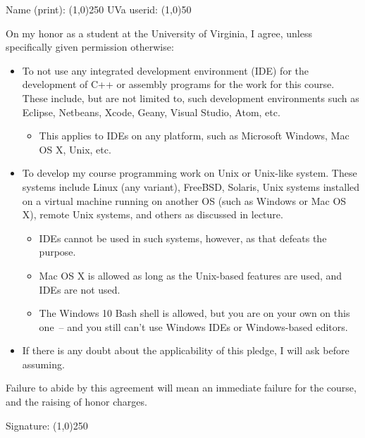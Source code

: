 \documentclass{article}
\begin{document}
\Large

\noindent Name (print): \line(1,0){250} \hspace{0.25in} UVa userid:
\line(1,0){50}

\vspace{0.5in}


\vspace{0.5in}

\noindent On my honor as a student at the University of Virginia, I
agree, unless specifically given permission otherwise:

\begin{itemize}

\item To not use any integrated development environment (IDE) for the
  development of C++ or assembly programs for the work for this
  course. These include, but are not limited to, such development
  environments such as Eclipse, Netbeans, Xcode, Geany, Visual Studio,
  Atom, etc.

\begin{itemize}

\item This applies to IDEs on any platform, such as Microsoft Windows,
  Mac OS X, Unix, etc.

\end{itemize}

\item To develop my course programming work on Unix or Unix-like
  system. These systems include Linux (any variant), FreeBSD, Solaris,
  Unix systems installed on a virtual machine running on another OS
  (such as Windows or Mac OS X), remote Unix systems, and others as
  discussed in lecture.

\begin{itemize}

\item IDEs cannot be used in such systems, however, as that defeats
  the purpose.

\item Mac OS X is allowed as long as the Unix-based features are used,
  and IDEs are not used.

\item The Windows 10 Bash shell is allowed, but you are on your own on
  this one~-- and you still can't use Windows IDEs or Windows-based
  editors.

\end{itemize}

\item If there is any doubt about the applicability of this pledge, I
  will ask before assuming.

\end{itemize}

\vspace{0.25in}

\noindent Failure to abide by this agreement will mean an immediate
failure for the course, and the raising of honor charges.

\vspace{0.5in}

\noindent Signature: \line(1,0){250}
\end{document}
